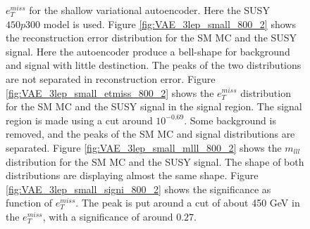 \begin{figure}[H]
{    $e_T^{miss}$ for the shallow variational autoencoder. Here the SUSY $450p300$ model is used.
    Figure \ref{fig:VAE_3lep_small_800_2} shows the reconstruction error 
    distribution for the SM MC and the SUSY signal. Here the autoencoder produce a bell-shape for background and 
    signal with little destinction. The peaks of the two distributions are not separated in reconstruction error. Figure \ref{fig:VAE_3lep_small_etmiss_800_2} 
    shows the $e_T^{miss}$ distribution for the SM MC and the SUSY signal in the signal region. 
    The signal region is made using a cut around $10^{-0.69}$. Some background is removed, and the peaks of the SM MC and signal 
    distributions are separated. Figure \ref{fig:VAE_3lep_small_mlll_800_2} shows the $m_{lll}$ distribution for the SM MC and the SUSY signal. 
    The shape of both distributions are displaying almost the same shape. Figure \ref{fig:VAE_3lep_small_signi_800_2} shows the significance as 
    function of $e_T^{miss}$. The peak is put around a cut of about 450 GeV in the $e_T^{miss}$, with a significance of around $0.27$.}
    \label{fig:VAE_3lep_small_rec_sig_signi_800_2}
\end{figure}












